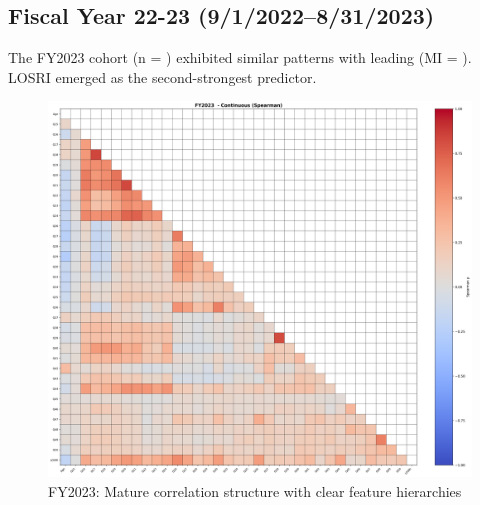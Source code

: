 \newpage

\subsection{Fiscal Year 22-23  (9/1/2022--8/31/2023)}

The FY2023 cohort (n = \FSRecordsFinalFYTwoThousandTwentyThree) exhibited similar patterns with \FSTopFeatureFYTwoThousandTwentyThree{} leading (MI = \FSTopMIFYTwoThousandTwentyThree). LOSRI emerged as the second-strongest predictor.

\vspace*{\fill}
\begin{figure}[htbp]
\centering
\includegraphics[width=\textwidth]{fy2023_continuous_spearman.png}
\caption{FY2023: Mature correlation structure with clear feature hierarchies}
\end{figure}
\vspace*{\fill}

\newpage

